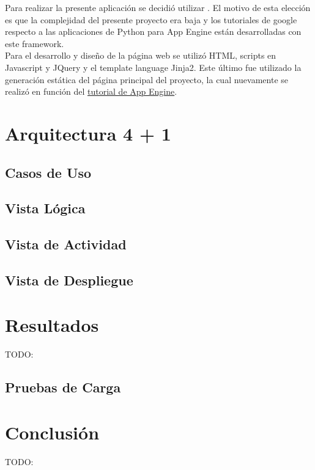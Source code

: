 \documentclass[a4paper,10pt]{article}
\begin{document}
        Para realizar la presente aplicación se decidió utilizar . El motivo de esta elección es que
        la complejidad del presente proyecto era baja y los tutoriales de google respecto a las aplicaciones de 
        Python para App Engine están desarrolladas con este framework. \\
        \indent Para el desarrollo y diseño de la página web se utilizó HTML, scripts en Javascript y JQuery 
        y el template language Jinja2. Este último fue utilizado la generación estática del página principal del 
        proyecto, la cual nuevamente se realizó en función del 
        \href{https://cloud.google.com/appengine/docs/python/gettingstartedpython27/introduction}{tutorial de App Engine}.
        

    \newpage
    \section{Arquitectura 4 + 1}

    \newpage
    \subsection{Casos de Uso}

    \newpage
    \subsection{Vista Lógica}

    \newpage
    \subsection{Vista de Actividad}

    \newpage
    \subsection{Vista de Despliegue}

    \newpage
    \section{Resultados}
        TODO:

    \newpage
    \subsection{Pruebas de Carga}

    \newpage
    \section{Conclusión} 
        TODO:
\end{document}
